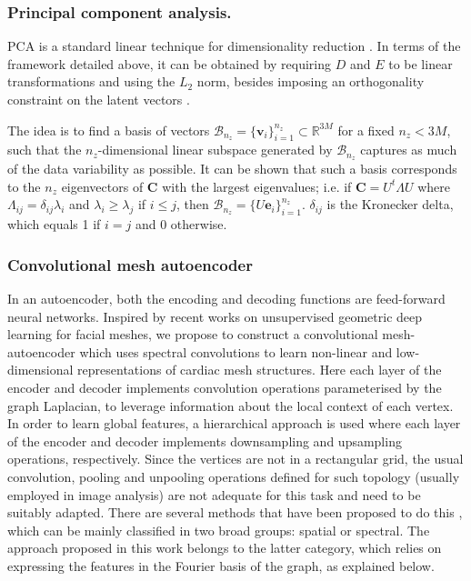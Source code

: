 \subsubsection{Principal component analysis.}
PCA is a standard linear technique for dimensionality reduction \cite{pearson_pca}. In terms of the framework detailed above, it can be obtained by requiring $D$ and $E$ to be linear transformations and using the $L_2$ norm, besides imposing an orthogonality constraint on the latent vectors \cite{goodfellow-et-al-2016}.

The idea is to find a basis of vectors  $\mathcal{B}_{n_z}=\{\textbf{v}_i\}_{i=1}^{n_z}\subset\mathbb{R}^{3M}$
for a fixed $n_z < 3M$, such that the $n_z$-dimensional linear subspace generated by $\mathcal{B}_{n_z}$ captures as much of the data variability as possible. It can be shown that such a basis corresponds to the $n_z$ eigenvectors of  $\textbf{C}$ with the largest eigenvalues; i.e. if $\textbf{C}=U^{t}\Lambda U$ where $\Lambda_{ij}=\delta_{ij}\lambda_i$ and $\lambda_i \geq \lambda_j$ if $i\leq j$, then $\mathcal{B}_{n_z}=\{{U\textbf{e}_i}\}_{i=1}^{n_z}$.
$\delta_{ij}$ is the Kronecker delta, which equals 1 if $i=j$ and 0 otherwise.

\subsubsection{Convolutional mesh autoencoder}
In an autoencoder, both the encoding and decoding functions are feed-forward neural networks.
Inspired by recent works on unsupervised geometric deep learning \cite{ref_coma} for facial meshes, we propose to construct a convolutional mesh-autoencoder which uses spectral convolutions \cite{ref_spectral_graph_conv} to learn non-linear and low-dimensional representations of cardiac mesh structures. Here each layer of the encoder and decoder implements convolution operations parameterised by the graph Laplacian, to leverage information about the local context of each vertex. In order to learn global features, a hierarchical approach is used where each layer of the encoder and decoder implements downsampling and upsampling operations, respectively. 
Since the vertices are not in a rectangular grid, the usual convolution, pooling and unpooling operations defined for such topology (usually employed in image analysis) are not adequate for this task and need to be suitably adapted. There are several methods that have been proposed to do this \cite{ref_bronstein_geom_DL}, which can be mainly classified in two broad groups: spatial or spectral. The approach proposed in this work belongs to the latter category, which relies on expressing the features in the Fourier basis of the graph, as explained below.

